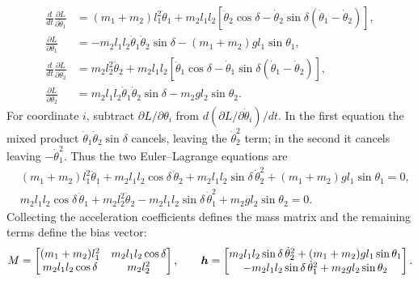 \documentclass[../main.tex]{subfiles}
\begin{document}
\begin{equation}
\begin{aligned}
\frac{d}{dt}\frac{\partial L}{\partial\dot\theta_1}
&=(m_1+m_2)l_1^2\ddot\theta_1
+m_2l_1l_2\left[\ddot\theta_2\cos\delta
-\dot\theta_2\sin\delta(\dot\theta_1-\dot\theta_2)\right],\\
\frac{\partial L}{\partial\theta_1}
&=-m_2l_1l_2\dot\theta_1\dot\theta_2\sin\delta
-(m_1+m_2)gl_1\sin\theta_1,\\
\frac{d}{dt}\frac{\partial L}{\partial\dot\theta_2}
&=m_2l_2^2\ddot\theta_2
+m_2l_1l_2\left[\ddot\theta_1\cos\delta
-\dot\theta_1\sin\delta(\dot\theta_1-\dot\theta_2)\right],\\
\frac{\partial L}{\partial\theta_2}
&=m_2l_1l_2\dot\theta_1\dot\theta_2\sin\delta
-m_2gl_2\sin\theta_2.
\end{aligned}
\label{eq:chapter1-lagrange-derivatives}
\end{equation}
For coordinate $i$, subtract $\partial L/\partial\theta_i$ from $d(\partial L/\partial\dot\theta_i)/dt$. In the first equation the mixed product $\dot\theta_1\dot\theta_2\sin\delta$ cancels, leaving the $\dot\theta_2^2$ term; in the second it cancels leaving $-\dot\theta_1^2$. Thus the two Euler--Lagrange equations are
\begin{equation}
\begin{aligned}
&(m_1+m_2)l_1^2\ddot\theta_1+m_2l_1l_2\cos\delta\,\ddot\theta_2
+m_2l_1l_2\sin\delta\,\dot\theta_2^2
+(m_1+m_2)gl_1\sin\theta_1=0,\\
&m_2l_1l_2\cos\delta\,\ddot\theta_1+m_2l_2^2\ddot\theta_2
-m_2l_1l_2\sin\delta\,\dot\theta_1^2
+m_2gl_2\sin\theta_2=0.
\end{aligned}
\label{eq:chapter1-lagrange-expanded-eom}
\end{equation}
Collecting the acceleration coefficients defines the mass matrix and the remaining terms define the bias vector:
\begin{equation}
M=\begin{bmatrix}
(m_1+m_2)l_1^2 & m_2l_1l_2\cos\delta\\
m_2l_1l_2\cos\delta & m_2l_2^2
\end{bmatrix},\qquad
\boldsymbol{h}=\begin{bmatrix}
m_2l_1l_2\sin\delta\,\dot\theta_2^2+(m_1+m_2)gl_1\sin\theta_1\\
-m_2l_1l_2\sin\delta\,\dot\theta_1^2+m_2gl_2\sin\theta_2
\end{bmatrix}.
\label{eq:chapter1-double-pendulum-mass-bias}
\end{equation}
\end{document}
